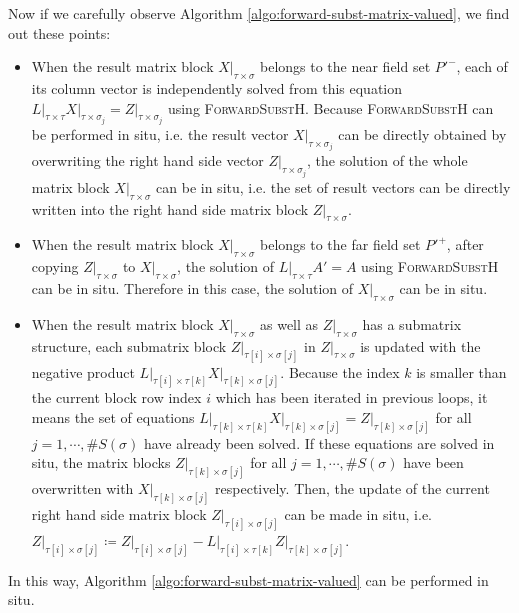 \documentclass[11pt, a4paper]{book}
\begin{document}
Now if we carefully observe Algorithm \ref{algo:forward-subst-matrix-valued}, we find out
these points:
\begin{itemize}
\item When the result matrix block $X \big\vert_{\tau\times\sigma}$ belongs to the near
  field set $P'^-$, each of its column vector is independently solved from this equation
  $L \big\vert_{\tau\times\tau} X \big\vert_{\tau\times\sigma_j} = Z
  \big\vert_{\tau\times\sigma_j}$ using \textsc{ForwardSubstH}. Because
  \textsc{ForwardSubstH} can be performed in situ, i.e. the result vector
  $X \big\vert_{\tau\times\sigma_j}$ can be directly obtained by overwriting the right
  hand side vector $Z \big\vert_{\tau\times\sigma_j}$, the solution of the whole matrix
  block $X \big\vert_{\tau\times\sigma}$ can be in situ, i.e. the set of result vectors
  can be directly written into the right hand side matrix block
  $Z \big\vert_{\tau\times\sigma}$.
\item When the result matrix block $X \big\vert_{\tau\times\sigma}$ belongs to the far
  field set $P'^+$, after copying $Z \big\vert_{\tau\times\sigma}$ to
  $X \big\vert_{\tau\times\sigma}$, the solution of $L \big\vert_{\tau\times\tau} A' = A$
  using \textsc{ForwardSubstH} can be in situ. Therefore in this case, the solution of
  $X \big\vert_{\tau\times\sigma}$ can be in situ.
\item When the result matrix block $X \big\vert_{\tau\times\sigma}$ as well as
  $Z \big\vert_{\tau\times\sigma}$ has a submatrix structure, each submatrix block
  $Z \big\vert_{\tau[i]\times\sigma[j]}$ in $Z \big\vert_{\tau\times\sigma}$ is updated
  with the negative product
  $L \big\vert_{\tau[i]\times\tau[k]}X \big\vert_{\tau[k]\times\sigma[j]}$. Because the
  index $k$ is smaller than the current block row index $i$ which has been iterated in
  previous loops, it means the set of equations
  $L \big\vert_{\tau[k]\times\tau[k]} X \big\vert_{\tau[k]\times\sigma[j]} = Z
  \big\vert_{\tau[k]\times\sigma[j]}$ for all $j=1,\cdots,\#S(\sigma)$ have already been
  solved. If these equations are solved in situ, the matrix blocks
  $Z \big\vert_{\tau[k]\times\sigma[j]}$ for all $j=1,\cdots,\#S(\sigma)$ have been
  overwritten with $X \big\vert_{\tau[k]\times\sigma[j]}$ respectively. Then, the update
  of the current right hand side matrix block $Z \big\vert_{\tau[i]\times\sigma[j]}$ can
  be made in situ, i.e.
  $Z \big\vert_{\tau[i]\times\sigma[j]} \coloneqq Z \big\vert_{\tau[i]\times\sigma[j]} - L
  \big\vert_{\tau[i]\times\tau[k]}Z \big\vert_{\tau[k]\times\sigma[j]}$.
\end{itemize}
In this way, Algorithm \ref{algo:forward-subst-matrix-valued} can be performed in situ.
\end{document}
